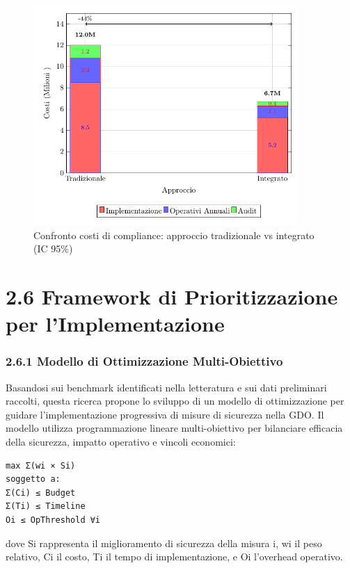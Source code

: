 \documentclass[12pt,a4paper,oneside]{book}
\begin{document}
\begin{figure}[htbp]
    \centering
    \includegraphics[width=0.9\textwidth]{figura 2-4}
    \caption{Confronto costi di compliance: approccio tradizionale vs integrato (IC 95\%)}
    \label{fig:confronto_costi}
\end{figure}

\section{2.6 Framework di Prioritizzazione per
l'Implementazione}\label{framework-di-prioritizzazione-per-limplementazione}

\subsubsection{2.6.1 Modello di Ottimizzazione
Multi-Obiettivo}\label{modello-di-ottimizzazione-multi-obiettivo}

Basandosi sui benchmark identificati nella letteratura e sui dati
preliminari raccolti, questa ricerca propone lo sviluppo di un modello
di ottimizzazione per guidare l'implementazione progressiva di misure di
sicurezza nella GDO. Il modello utilizza programmazione lineare
multi-obiettivo per bilanciare efficacia della sicurezza, impatto
operativo e vincoli economici:

\begin{verbatim}
max Σ(wi × Si)
soggetto a:
Σ(Ci) ≤ Budget
Σ(Ti) ≤ Timeline
Oi ≤ OpThreshold ∀i
\end{verbatim}

dove Si rappresenta il miglioramento di sicurezza della misura i, wi il
peso relativo, Ci il costo, Ti il tempo di implementazione, e Oi
l'overhead operativo.
\end{document}
